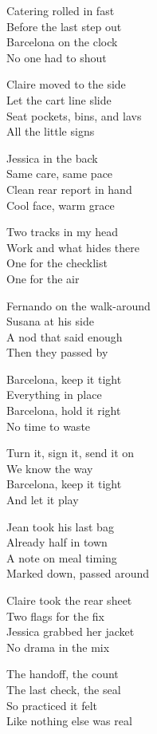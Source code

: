 \begin{lyrics}
Catering rolled in fast\\
Before the last step out\\
Barcelona on the clock\\
No one had to shout

Claire moved to the side\\
Let the cart line slide\\
Seat pockets, bins, and lavs\\
All the little signs

Jessica in the back\\
Same care, same pace\\
Clean rear report in hand\\
Cool face, warm grace

Two tracks in my head\\
Work and what hides there\\
One for the checklist\\
One for the air

Fernando on the walk-around\\
Susana at his side\\
A nod that said enough\\
Then they passed by

Barcelona, keep it tight\\
Everything in place\\
Barcelona, hold it right\\
No time to waste

Turn it, sign it, send it on\\
We know the way\\
Barcelona, keep it tight\\
And let it play

Jean took his last bag\\
Already half in town\\
A note on meal timing\\
Marked down, passed around

Claire took the rear sheet\\
Two flags for the fix\\
Jessica grabbed her jacket\\
No drama in the mix

The handoff, the count\\
The last check, the seal\\
So practiced it felt\\
Like nothing else was real


\end{lyrics}
